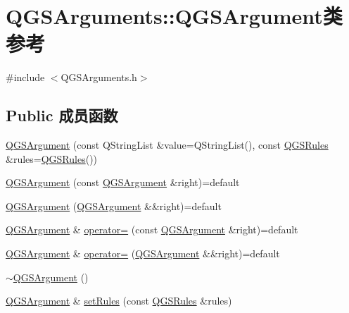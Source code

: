 \hypertarget{class_q_g_s_arguments_1_1_q_g_s_argument}{}\section{Q\+G\+S\+Arguments\+:\+:Q\+G\+S\+Argument类 参考}
\label{class_q_g_s_arguments_1_1_q_g_s_argument}


{\ttfamily \#include $<$Q\+G\+S\+Arguments.\+h$>$}

\subsection*{Public 成员函数}
\begin{DoxyCompactItemize}
\item 
\mbox{\hyperlink{class_q_g_s_arguments_1_1_q_g_s_argument_a544a55babeef51e1b3d59a4ce3d6e91a}{Q\+G\+S\+Argument}} (const Q\+String\+List \&value=Q\+String\+List(), const \mbox{\hyperlink{class_q_g_s_rules}{Q\+G\+S\+Rules}} \&rules=\mbox{\hyperlink{class_q_g_s_rules}{Q\+G\+S\+Rules}}())
\item 
\mbox{\hyperlink{class_q_g_s_arguments_1_1_q_g_s_argument_a4c0705a35f9d8bb2c4a00f8b6746f248}{Q\+G\+S\+Argument}} (const \mbox{\hyperlink{class_q_g_s_arguments_1_1_q_g_s_argument}{Q\+G\+S\+Argument}} \&right)=default
\item 
\mbox{\hyperlink{class_q_g_s_arguments_1_1_q_g_s_argument_a98563768ddd03d1a21acd395f5d1cb32}{Q\+G\+S\+Argument}} (\mbox{\hyperlink{class_q_g_s_arguments_1_1_q_g_s_argument}{Q\+G\+S\+Argument}} \&\&right)=default
\item 
\mbox{\hyperlink{class_q_g_s_arguments_1_1_q_g_s_argument}{Q\+G\+S\+Argument}} \& \mbox{\hyperlink{class_q_g_s_arguments_1_1_q_g_s_argument_a2c7e5ab2aa7aa5914be5b3b1ed3cebac}{operator=}} (const \mbox{\hyperlink{class_q_g_s_arguments_1_1_q_g_s_argument}{Q\+G\+S\+Argument}} \&right)=default
\item 
\mbox{\hyperlink{class_q_g_s_arguments_1_1_q_g_s_argument}{Q\+G\+S\+Argument}} \& \mbox{\hyperlink{class_q_g_s_arguments_1_1_q_g_s_argument_ac7baaa2966a0fbeebf6caa4457773bbd}{operator=}} (\mbox{\hyperlink{class_q_g_s_arguments_1_1_q_g_s_argument}{Q\+G\+S\+Argument}} \&\&right)=default
\item 
\mbox{\hyperlink{class_q_g_s_arguments_1_1_q_g_s_argument_a3c44b3aa099216dfa1d56be254a0b7eb}{$\sim$\+Q\+G\+S\+Argument}} ()
\item 
\mbox{\hyperlink{class_q_g_s_arguments_1_1_q_g_s_argument}{Q\+G\+S\+Argument}} \& \mbox{\hyperlink{class_q_g_s_arguments_1_1_q_g_s_argument_a13e3693a50fa22a926f87e3dd3f50e13}{set\+Rules}} (const \mbox{\hyperlink{class_q_g_s_rules}{Q\+G\+S\+Rules}} \&rules)

\end{DoxyCompactItemize}
